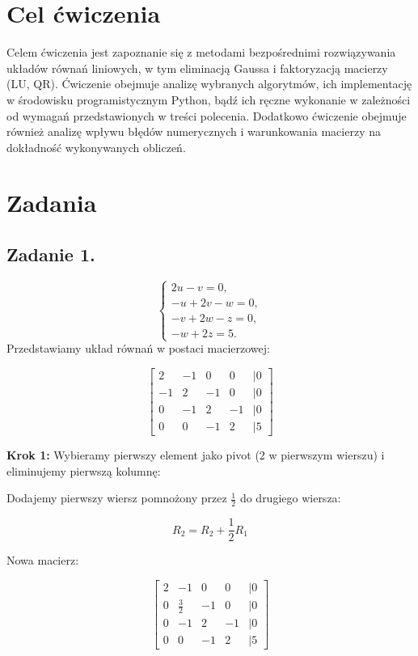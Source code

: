 \documentclass{article}
\begin{document}
\section{Cel ćwiczenia}
Celem ćwiczenia jest zapoznanie się z metodami bezpośrednimi rozwiązywania układów równań liniowych, w tym eliminacją Gaussa i faktoryzacją macierzy (LU, QR). Ćwiczenie obejmuje analizę wybranych algorytmów, ich implementację w środowisku programistycznym Python, bądź ich ręczne wykonanie w zależności od wymagań przedstawionych w treści polecenia. Dodatkowo ćwiczenie obejmuje również analizę wpływu błędów numerycznych i warunkowania macierzy na dokładność wykonywanych obliczeń.

\section{Zadania}
\subsection{Zadanie 1.}

\[
\begin{cases}
    2u - v = 0, \\
    -u + 2v - w = 0, \\
    -v + 2w - z = 0, \\
    -w + 2z = 5.
\end{cases}
\]
\newline
Przedstawiamy układ równań w postaci macierzowej:

\[
\begin{bmatrix}
2 & -1 & 0 & 0 & | 0 \\
-1 & 2 & -1 & 0 & | 0 \\
0 & -1 & 2 & -1 & | 0 \\
0 & 0 & -1 & 2 & | 5
\end{bmatrix}
\]

\textbf{Krok 1:} Wybieramy pierwszy element jako pivot (2 w pierwszym wierszu) i eliminujemy pierwszą kolumnę:

Dodajemy pierwszy wiersz pomnożony przez \( \frac{1}{2} \) do drugiego wiersza:

\[
R_2 = R_2 + \frac{1}{2} R_1
\]

Nowa macierz:

\[
\begin{bmatrix}
2 & -1 & 0 & 0 & | 0 \\
0 & \frac{3}{2} & -1 & 0 & | 0 \\
0 & -1 & 2 & -1 & | 0 \\
0 & 0 & -1 & 2 & | 5
\end{bmatrix}
\]
\end{document}
